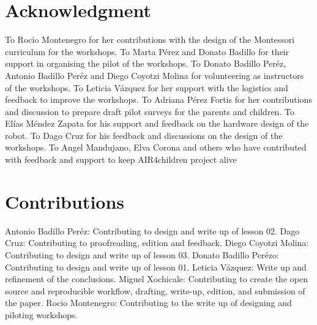 \documentclass[conference]{IEEEtran}
\begin{document}
\section*{Acknowledgment}
To Rocio Montenegro for her contributions with the design of the Montessori curriculum for the workshops.
To Marta P\'erez and Donato Badillo for their support in organising the pilot of the workshops.
To Donato Badillo Per\'ez, Antonio Badillo Per\'ez and Diego Coyotzi Molina for volunteering as instructors of the workshops.
To Leticia V\'azquez for her support with the logistics and feedback to improve the workshops.
To Adriana P\'erez Fortis for her contributions and discussion to prepare draft pilot surveys for the parents and children. 
To El\'ias M\'endez Zapata for his support and feedback on the hardware design of the robot.
To Dago Cruz for his feedback and discussions on the design of the workshops.
To Angel Mandujano, Elva Corona and others who have contributed with feedback and support to keep AIR4children project alive


\section*{Contributions}
Antonio Badillo Per\'ez: Contributing to design and write up of lesson 02.
Dago Cruz: Contributing to proofreading, edition and feedback.
Diego Coyotzi Molina: Contributing to design and write up of lesson 03.
Donato Badillo Per\'ezo: Contributing to design and write up of lesson 01.
Leticia V\'azquez: Write up and refinement of the conclusions.
Miguel Xochicale: Contributing to create the open source and reproducible workflow, drafting, write-up, edition, and submission of the paper. 
Rocio Montenegro: Contributing to the write up of designing and piloting workshops. 


\end{document}
